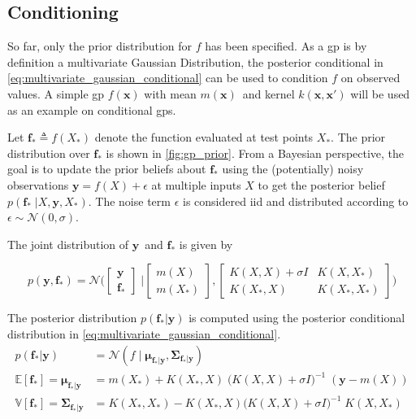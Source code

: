 \subsection{Conditioning}
So far, only the prior distribution for $f$ has been specified. As a \acrshort{gp} is by definition a multivariate Gaussian Distribution, the posterior conditional in \cref{eq:multivariate_gaussian_conditional} can be used to condition $f$ on observed values. A simple \acrshort{gp} $f(\boldsymbol{x})$ with mean $m(\boldsymbol{x})$ and kernel $k(\boldsymbol{x}, \boldsymbol{x}')$ will be used as an example on conditional \acrshort{gp}s.

Let $\boldsymbol{f}_* \triangleq f(X_*)$ denote the function evaluated at test points $X_*$. The prior distribution over $\boldsymbol{f_*}$ is shown in \cref{fig:gp_prior}. From a Bayesian perspective, the goal is to update the prior beliefs about $\boldsymbol{f}_*$ using the (potentially) noisy observations $\boldsymbol{y} = f(X) + \epsilon$ at multiple inputs $X$ to get the posterior belief $p(\boldsymbol{f}_* \; | X, \boldsymbol{y}, X_*)$. The noise term $\epsilon$ is considered \acrshort{iid} and distributed according to $\epsilon \sim \mathcal{N}(0, \sigma)$.

The joint distribution of $\boldsymbol{y}$ and $\boldsymbol{f}_*$ is given by 

\begin{equation}
    p(\boldsymbol{y}, \boldsymbol{f}_*) = \mathcal{N}\bigg(\begin{bmatrix}
        \boldsymbol{y} \\ \boldsymbol{f}_*
    \end{bmatrix} \; \bigg| \begin{bmatrix}
        m(X) \\ m(X_*)
    \end{bmatrix},  \begin{bmatrix}
        K(X, X) + \sigma I & K(X, X_*) \\ K(X_*, X) & K(X_*, X_*)
    \end{bmatrix}\bigg)
\end{equation}

The posterior distribution $p(\boldsymbol{f}_* | \boldsymbol{y})$ is computed using the posterior conditional distribution in \cref{eq:multivariate_gaussian_conditional}.
\begin{subequations}\label{eq:gp_conditional}
\begin{align}
    p(\boldsymbol{f}_* | \boldsymbol{y}) &= \mathcal{N}(f \; | \; \boldsymbol{\mu}_{\boldsymbol{f}_*|\boldsymbol{y}}, \boldsymbol{\Sigma}_{\boldsymbol{f}_*|\boldsymbol{y}})\\
    \mathbb{E}[\boldsymbol{f}_*] =  \boldsymbol{\mu}_{\boldsymbol{f}_* | \boldsymbol{y}} &= m(X_*) + K(X_*, X) \; \big(K(X, X) + \sigma I\big)^{-1} \; (\boldsymbol{y} - m(X))\label{eq:gp_conditional_mean}\\
    \mathbb{V}[\boldsymbol{f}_*] = \boldsymbol{\Sigma}_{\boldsymbol{f}_* | \boldsymbol{y}} &= K(X_*, X_*) - K(X_*, X)  \big(K(X, X) + \sigma I\big)^{-1} \; K(X, X_*)\label{eq:gp_conditional_var}
\end{align}
\end{subequations}

